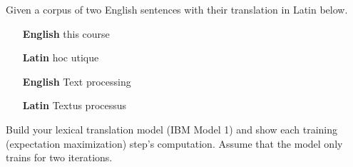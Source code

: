 Given a corpus of two English sentences with their translation in Latin below.

\begin{itemize}
	\item [\textbf{English}] this course
	\item [\textbf{Latin}]   hoc utique
	\item [\textbf{English}] Text processing
	\item [\textbf{Latin}]   Textus processus
\end{itemize}

Build your lexical translation model (IBM Model 1) and show each training (expectation maximization) step’s computation. 
Assume that the model only trains for two iterations.
